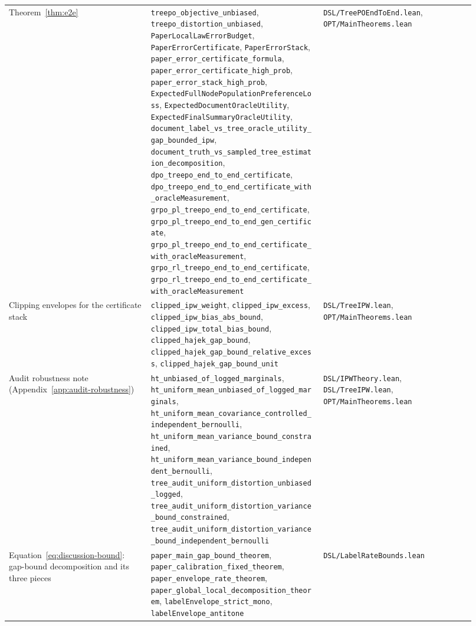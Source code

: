 {\begin{longtable}{p{0.28\linewidth}p{0.34\linewidth}p{0.30\linewidth}}
Theorem~\ref{thm:e2e} &
\texttt{treepo\_objective\_unbiased}, \texttt{treepo\_distortion\_unbiased}, \texttt{PaperLocalLawErrorBudget}, \texttt{PaperErrorCertificate}, \texttt{PaperErrorStack}, \texttt{paper\_error\_certificate\_formula}, \texttt{paper\_error\_certificate\_high\_prob}, \texttt{paper\_error\_stack\_high\_prob}, \texttt{ExpectedFullNodePopulationPreferenceLoss}, \texttt{ExpectedDocumentOracleUtility}, \texttt{ExpectedFinalSummaryOracleUtility}, \texttt{document\_label\_vs\_tree\_oracle\_utility\_gap\_bounded\_ipw}, \texttt{document\_truth\_vs\_sampled\_tree\_estimation\_decomposition}, \texttt{dpo\_treepo\_end\_to\_end\_certificate}, \texttt{dpo\_treepo\_end\_to\_end\_certificate\_with\_oracleMeasurement}, \texttt{grpo\_pl\_treepo\_end\_to\_end\_certificate}, \texttt{grpo\_pl\_treepo\_end\_to\_end\_gen\_certificate}, \texttt{grpo\_pl\_treepo\_end\_to\_end\_certificate\_with\_oracleMeasurement}, \texttt{grpo\_rl\_treepo\_end\_to\_end\_certificate}, \texttt{grpo\_rl\_treepo\_end\_to\_end\_certificate\_with\_oracleMeasurement} &
\texttt{DSL/TreePOEndToEnd.lean}, \texttt{OPT/MainTheorems.lean} \\

Clipping envelopes for the certificate stack &
\texttt{clipped\_ipw\_weight}, \texttt{clipped\_ipw\_excess}, \texttt{clipped\_ipw\_bias\_abs\_bound}, \texttt{clipped\_ipw\_total\_bias\_bound}, \texttt{clipped\_hajek\_gap\_bound}, \texttt{clipped\_hajek\_gap\_bound\_relative\_excess}, \texttt{clipped\_hajek\_gap\_bound\_unit} &
\texttt{DSL/TreeIPW.lean}, \texttt{OPT/MainTheorems.lean} \\

Audit robustness note (Appendix~\ref{app:audit-robustness}) &
\texttt{ht\_unbiased\_of\_logged\_marginals}, \texttt{ht\_uniform\_mean\_unbiased\_of\_logged\_marginals}, \texttt{ht\_uniform\_mean\_covariance\_controlled\_independent\_bernoulli}, \texttt{ht\_uniform\_mean\_variance\_bound\_constrained}, \texttt{ht\_uniform\_mean\_variance\_bound\_independent\_bernoulli}, \texttt{tree\_audit\_uniform\_distortion\_unbiased\_logged}, \texttt{tree\_audit\_uniform\_distortion\_variance\_bound\_constrained}, \texttt{tree\_audit\_uniform\_distortion\_variance\_bound\_independent\_bernoulli} &
\texttt{DSL/IPWTheory.lean}, \texttt{DSL/TreeIPW.lean}, \texttt{OPT/MainTheorems.lean} \\

Equation~\eqref{eq:discussion-bound}: gap-bound decomposition and its three pieces &
\texttt{paper\_main\_gap\_bound\_theorem}, \texttt{paper\_calibration\_fixed\_theorem}, \texttt{paper\_envelope\_rate\_theorem}, \texttt{paper\_global\_local\_decomposition\_theorem}, \texttt{labelEnvelope\_strict\_mono}, \texttt{labelEnvelope\_antitone} &
\texttt{DSL/LabelRateBounds.lean} \\


\end{longtable}}
